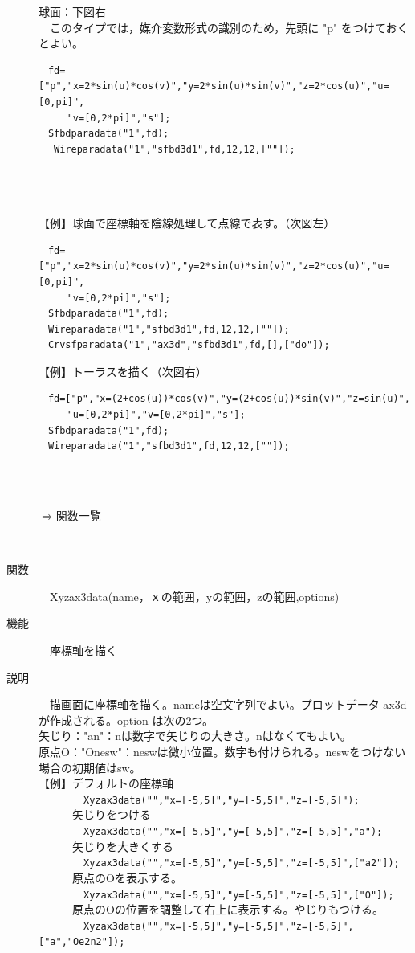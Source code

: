 \documentclass[papersize,a4paper,12pt,uplatex]{jsarticle}
\begin{document}
\begin{description}
球面：下図右\\
　このタイプでは，媒介変数形式の識別のため，先頭に "p" をつけておくとよい。
\begin{verbatim}
　fd=["p","x=2*sin(u)*cos(v)","y=2*sin(u)*sin(v)","z=2*cos(u)","u=[0,pi]",
　　　"v=[0,2*pi]","s"];
　Sfbdparadata("1",fd);
　 Wireparadata("1","sfbd3d1",fd,12,12,[""]); 
\end{verbatim}
　\\
　　\\
　\\
【例】球面で座標軸を陰線処理して点線で表す。（次図左）
\begin{verbatim}
　fd=["p","x=2*sin(u)*cos(v)","y=2*sin(u)*sin(v)","z=2*cos(u)","u=[0,pi]",
　　　"v=[0,2*pi]","s"];
　Sfbdparadata("1",fd);
　Wireparadata("1","sfbd3d1",fd,12,12,[""]); 
　Crvsfparadata("1","ax3d","sfbd3d1",fd,[],["do"]);
\end{verbatim}
【例】トーラスを描く（次図右）
\begin{verbatim}
　fd=["p","x=(2+cos(u))*cos(v)","y=(2+cos(u))*sin(v)","z=sin(u)",
　　　"u=[0,2*pi]","v=[0,2*pi]","s"];
　Sfbdparadata("1",fd);
　Wireparadata("1","sfbd3d1",fd,12,12,[""]); 
\end{verbatim}
　\\
　　　　\\

\begin{flushright} \hyperlink{functionlist3d}{$\Rightarrow$関数一覧}\end{flushright}
　\\
\hypertarget{xyzax3data}{}
\item[関数]　Xyzax3data(name，ｘの範囲，yの範囲，zの範囲,options)
\item[機能]　座標軸を描く
\item[説明]　描画面に座標軸を描く。nameは空文字列でよい。プロットデータ ax3d  が作成される。option は次の2つ。\\
矢じり："an"：nは数字で矢じりの大きさ。nはなくてもよい。\\
原点O："Onesw"：neswは微小位置。数字も付けられる。neswをつけない場合の初期値はsw。\\
【例】デフォルトの座標軸\\
　　　　\verb|Xyzax3data("","x=[-5,5]","y=[-5,5]","z=[-5,5]");|\\
　　　矢じりをつける\\
　　　　\verb|Xyzax3data("","x=[-5,5]","y=[-5,5]","z=[-5,5]","a");|\\
　　　矢じりを大きくする\\
　　　　\verb|Xyzax3data("","x=[-5,5]","y=[-5,5]","z=[-5,5]",["a2"]);|\\
　　　原点のOを表示する。\\
　　　　\verb|Xyzax3data("","x=[-5,5]","y=[-5,5]","z=[-5,5]",["O"]);|\\
　　　原点のOの位置を調整して右上に表示する。やじりもつける。\\
　　　　\verb|Xyzax3data("","x=[-5,5]","y=[-5,5]","z=[-5,5]",["a","Oe2n2"]);|\\


\end{description}
\end{document}

